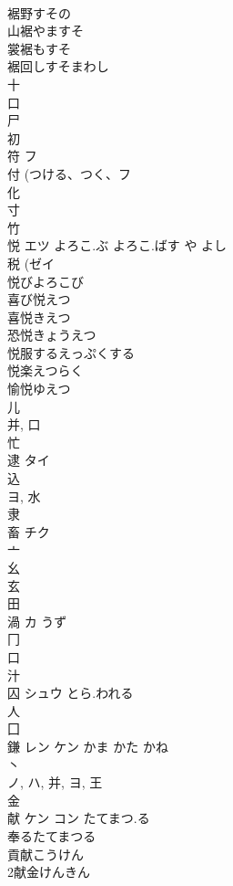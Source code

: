 \documentclass[8pt]{extreport}
\begin{document}
\begin{CJK}{UTF8}{min}
\\	裾野すその
\\	山裾やますそ
\\	裳裾もすそ
\\	裾回しすそまわし
\\	十 
\\	口 
\\	尸 
\\	初 
\\	符	フ		
\\	付 (つける、つく、フ 
\\	化 
\\	寸 
\\	竹 
\\	悦	エツ	よろこ.ぶ よろこ.ばす や よし	
\\	税 (ゼイ 
\\	悦びよろこび
\\	喜び悦えつ
\\	喜悦きえつ
\\	恐悦きょうえつ
\\	悦服するえっぷくする
\\	悦楽えつらく
\\	愉悦ゆえつ
\\	儿 
\\	并, 口 
\\	忙 
\\	逮	タイ		
\\	込 
\\	ヨ, 水 
\\	隶 
\\	畜	チク		
\\	亠 
\\	幺 
\\	玄 
\\	田 
\\	渦	カ	うず	
\\	冂 
\\	口 
\\	汁 
\\	囚	シュウ	とら.われる	
\\	人 
\\	囗 
\\	鎌	レン ケン	かま かた かね	
\\	丶 
\\	ノ, ハ, 并, ヨ, 王 
\\	金 
\\	献	ケン コン	たてまつ.る	
\\	奉るたてまつる
\\	貢献こうけん
\\	2献金けんきん

\end{CJK}
\end{document}
